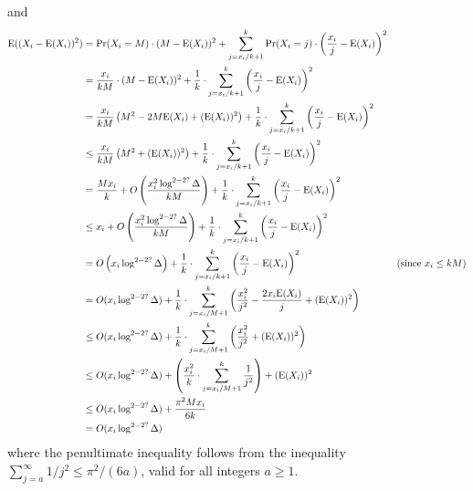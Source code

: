 \documentclass{patmorin}
\begin{document}
and
\begin{align*}
  \mathrm{E}((X_i-\mathrm{E}(X_i))^2)
  & = \Pr(X_i=M)\cdot(M-\mathrm{E}(X_i))^2
    + \sum_{j=x_i/k+1}^k \Pr(X_i=j)\cdot\left(\frac{x_i}{j}-\mathrm{E}(X_i)\right)^2 \\
  & = \frac{x_i}{kM}\cdot(M-\mathrm{E}(X_i))^2
    + \frac{1}{k}\cdot\sum_{j=x_i/k+1}^k \left(\frac{x_i}{j}-\mathrm{E}(X_i)\right)^2 \\
  & = \frac{x_i}{kM}\left(M^2-2M\mathrm{E}(X_i)+(\mathrm{E}(X_i))^2\right)
    + \frac{1}{k}\cdot \sum_{j=x_i/k+1}^k \left(\frac{x_i}{j}-\mathrm{E}(X_i)\right)^2 \\
  & \le \frac{x_i}{kM}\left(M^2 + (\mathrm{E}(X_i))^2\right)
    + \frac{1}{k}\cdot \sum_{j=x_i/k+1}^k \left(\frac{x_i}{j}-\mathrm{E}(X_i)\right)^2 \\
  & = \frac{M x_i}{k} + O\left(\frac{x_i^2\log^{2-2?} \Delta}{kM}\right)
      + \frac{1}{k}\cdot\sum_{j=x_i/k+1}^k \left(\frac{x_i}{j}-\mathrm{E}(X_i)\right)^2 \\
  & \le x_i + O\left(\frac{x_i^2\log^{2-2?} \Delta}{kM}\right)
      + \frac{1}{k}\cdot\sum_{j=x_i/k+1}^k \left(\frac{x_i}{j}-\mathrm{E}(X_i)\right)^2 \\
  & = O\left(x_i\log^{2-2?} \Delta\right)
      + \frac{1}{k}\cdot\sum_{j=x_i/k+1}^k \left(\frac{x_i}{j}-\mathrm{E}(X_i)\right)^2
      & \text{(since $x_i\le kM$)} \\
 & = O(x_i\log^{2-2?}\Delta) + \frac{1}{k}\cdot\sum_{j=x_i/M+1}^k \left(\frac{x_i^2}{j^2}-\frac{2x_i \mathrm{E}(X_i)}{j} + (\mathrm{E}(X_i))^2\right) \\
 & \le O(x_i\log^{2-2?}\Delta) + \frac{1}{k}\cdot\sum_{j=x_i/M+1}^k \left(\frac{x_i^2}{j^2} + (\mathrm{E}(X_i))^2\right) \\
 & \le O(x_i\log^{2-2?}\Delta) +  \left(\frac{x_i^2}{k}\cdot\sum_{j=x_i/M+1}^k\frac{1}{j^2}\right)
   + (\mathrm{E}(X_i))^2 \\
 & \le O(x_i\log^{2-2?}\Delta) + \frac{\pi^2 Mx_i}{6k} \\
  & = O(x_i\log^{2-2?}\Delta)
\end{align*}
where the penultimate inequality follows from the inequality $\sum_{j=a}^{\infty} 1/j^2 \le \pi^2/(6a)$, valid for all integers $a\ge 1$.
\end{document}
